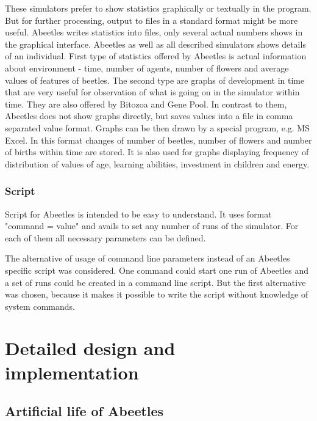 \documentclass[a4paper,12pt]{report}
\begin{document}
These simulators prefer to show statistics graphically or textually in the program. But for further processing, output to files in a standard format might be more useful. Abeetles writes statistics into files, only several actual numbers shows in the graphical interface. Abeetles as well as all described simulators shows details of an individual. First type of statistics offered by Abeetles is actual information about environment - time, number of agents, number of flowers and average values of features of beetles. The second type are graphs of development in time that are very useful for observation of what is going on in the simulator within time. They are also offered by Bitozoa and Gene Pool. In contrast to them, Abeetles does not show graphs directly, but saves values into a file in comma separated value format. Graphs can be then drawn by a special program, e.g. MS Excel. In this format changes of number of beetles, number of flowers and number of births within time are stored. It is also used for graphs displaying frequency of distribution of values of age, learning abilities, investment in children and energy.

  
\subsection {Script}

Script for Abeetles is intended to be easy to understand. It uses format
"command = value" and avails to set any number of runs of the simulator. For each of them all necessary parameters can be defined.

The alternative of usage of command line parameters instead of an Abeetles specific script was considered. One command could start one run of Abeetles and a set of runs could be created in a command line script. But the first alternative was chosen, because it makes it possible to write the script without knowledge of system commands.


\chapter{Detailed design and implementation}

\section{Artificial life of Abeetles}
\end{document}
